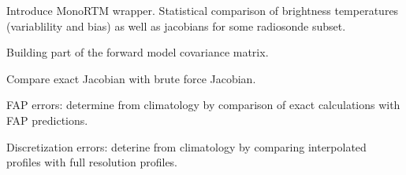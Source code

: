     \stopsubsection

    \startsubsection[title=Comparison with MonoRTM]

        Introduce MonoRTM wrapper. Statistical comparison of brightness
        temperatures (variablility and bias) as well as jacobians for some
        radiosonde subset.

    \stopsubsection

    \startsubsection[title={Characterizing Errors},reference={ch:rtm_errors}]

        Building part of the forward model covariance matrix.

        Compare exact Jacobian with brute force Jacobian.

        FAP errors: determine from climatology by comparison of exact
        calculations with FAP predictions.

        Discretization errors: deterine from climatology by comparing
        interpolated profiles with full resolution profiles.

    \stopsubsection

\stopsection

